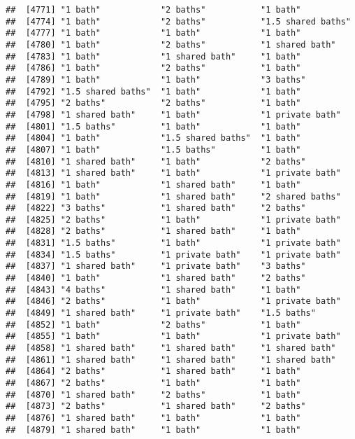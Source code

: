 \documentclass[
]{article}
\begin{document}
\begin{verbatim}
##  [4771] "1 bath"            "2 baths"           "1 bath"           
##  [4774] "1 bath"            "2 baths"           "1.5 shared baths" 
##  [4777] "1 bath"            "1 bath"            "1 bath"           
##  [4780] "1 bath"            "2 baths"           "1 shared bath"    
##  [4783] "1 bath"            "1 shared bath"     "1 bath"           
##  [4786] "1 bath"            "2 baths"           "1 bath"           
##  [4789] "1 bath"            "1 bath"            "3 baths"          
##  [4792] "1.5 shared baths"  "1 bath"            "1 bath"           
##  [4795] "2 baths"           "2 baths"           "1 bath"           
##  [4798] "1 shared bath"     "1 bath"            "1 private bath"   
##  [4801] "1.5 baths"         "1 bath"            "1 bath"           
##  [4804] "1 bath"            "1.5 shared baths"  "1 bath"           
##  [4807] "1 bath"            "1.5 baths"         "1 bath"           
##  [4810] "1 shared bath"     "1 bath"            "2 baths"          
##  [4813] "1 shared bath"     "1 bath"            "1 private bath"   
##  [4816] "1 bath"            "1 shared bath"     "1 bath"           
##  [4819] "1 bath"            "1 shared bath"     "2 shared baths"   
##  [4822] "3 baths"           "1 shared bath"     "2 baths"          
##  [4825] "2 baths"           "1 bath"            "1 private bath"   
##  [4828] "2 baths"           "1 shared bath"     "1 bath"           
##  [4831] "1.5 baths"         "1 bath"            "1 private bath"   
##  [4834] "1.5 baths"         "1 private bath"    "1 private bath"   
##  [4837] "1 shared bath"     "1 private bath"    "3 baths"          
##  [4840] "1 bath"            "1 shared bath"     "2 baths"          
##  [4843] "4 baths"           "1 shared bath"     "1 bath"           
##  [4846] "2 baths"           "1 bath"            "1 private bath"   
##  [4849] "1 shared bath"     "1 private bath"    "1.5 baths"        
##  [4852] "1 bath"            "2 baths"           "1 bath"           
##  [4855] "1 bath"            "1 bath"            "1 private bath"   
##  [4858] "1 shared bath"     "1 shared bath"     "1 shared bath"    
##  [4861] "1 shared bath"     "1 shared bath"     "1 shared bath"    
##  [4864] "2 baths"           "1 shared bath"     "1 bath"           
##  [4867] "2 baths"           "1 bath"            "1 bath"           
##  [4870] "1 shared bath"     "2 baths"           "1 bath"           
##  [4873] "2 baths"           "1 shared bath"     "2 baths"          
##  [4876] "1 shared bath"     "1 bath"            "1 bath"           
##  [4879] "1 shared bath"     "1 bath"            "1 bath"           

\end{verbatim}
\end{document}

